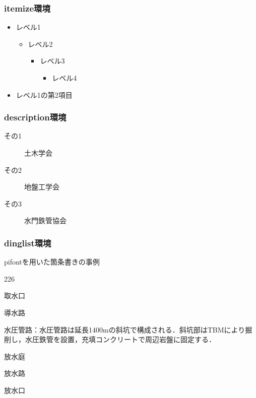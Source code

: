 \documentclass[a4paper,10pt]{jsarticle}
\begin{document}
\subsubsection{itemize環境}
\begin{itemize}
\item レベル1
  \begin{itemize}
  \item レベル2
    \begin{itemize}
    \item レベル3
      \begin{itemize}
      \item レベル4
      \end{itemize}
    \end{itemize}
  \end{itemize}
\item レベル1の第2項目
\end{itemize}


\subsubsection{description環境}
\begin{description}
\item[その1]土木学会
\item[その2]地盤工学会
\item[その3]水門鉄管協会
\end{description}


\subsubsection{dinglist環境}
pifontを用いた箇条書きの事例

\begin{dinglist}{226}
\item 取水口
\item 導水路
\item 水圧管路：水圧管路は延長1400mの斜坑で構成される．斜坑部はTBMにより掘削し，水圧鉄管を設置，充填コンクリートで周辺岩盤に固定する．
\end{dinglist}

\begin{dinglist}{51}
\item 放水庭
\item 放水路
\item 放水口
\end{dinglist}
\end{document}
